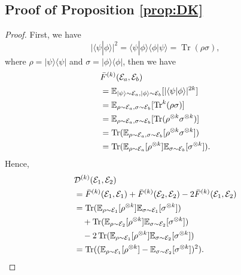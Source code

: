 \documentclass[aps,prx,reprint,superscriptaddress,amsmath,amssymb,longbibliography,floatfix]{revtex4-2}
\newcommand{\abs}[1]{\lvert #1\rvert}
\providecommand{\ket}[1]{|#1 \rangle}
\providecommand{\braket}[2]{\langle #1|#2 \rangle}
\providecommand{\ketbra}[2]{|#1\rangle \langle #2|}
\newcommand{\dsE}{\mathbb{E}}
\newcommand{\scD}{\mathcal{D}}
\newcommand{\scE}{\mathcal{E}}
\newcommand{\Tr}{\operatorname{Tr}}
\theoremstyle{plain}
\theoremstyle{definition}
\theoremstyle{remark}
\begin{document}
\label{appsub: proofs of MMD-k's properties}
\subsection{Proof of Proposition \ref{prop:DK}}
\begin{proof}
First, we have
\begin{equation*}
    \abs{\braket{\psi}{\phi}}^2=\braket{\psi}{\phi}\braket{\phi}{\psi}=\Tr(\rho\sigma),
\end{equation*}
where $\rho=\ketbra{\psi}{\psi}$ and $\sigma=\ketbra{\phi}{\phi}$, then we have
\begin{align}
&\bar{F}^{(k)}(\scE_a, \scE_b) 
    \notag\\
    &= \dsE_{\ket{\psi}\sim\scE_a, \ket{\phi}\sim\scE_b} [\abs{\braket{\psi}{\phi}}^{2k}]\notag\\
    &= \dsE_{\rho\sim\scE_a, \sigma\sim\scE_b}[\Tr^k(\rho\sigma)]\notag\\
    &= \dsE_{\rho\sim\scE_a, \sigma\sim\scE_b}[\Tr(\rho^{\otimes k}\sigma^{\otimes k})]\notag\\
    &= \Tr(\dsE_{\rho\sim\scE_a, \sigma\sim\scE_b}[\rho^{\otimes k}\sigma^{\otimes k}]) \notag\\
    &= \Tr(\dsE_{\rho\sim\scE_a}[\rho^{\otimes k}] \dsE_{\sigma\sim\scE_b}[\sigma^{\otimes k}]).
\label{eq:app-frame-potential-moments}
\end{align}
Hence,
\begin{align}
&
    \scD^{(k)}(\scE_1,\scE_2) 
    \notag\\
    &= \bar{F}^{(k)}(\scE_1, \scE_1)+\bar{F}^{(k)}(\scE_2, \scE_2) - 2\bar{F}^{(k)}(\scE_1, \scE_2)\notag\\
    &=\Tr(\dsE_{\rho\sim\scE_1}[\rho^{\otimes k}] \dsE_{\sigma\sim\scE_1}[\sigma^{\otimes k}])\notag\\
    &\quad+ \Tr(\dsE_{\rho\sim\scE_2}[\rho^{\otimes k}] \dsE_{\sigma\sim\scE_2}[\sigma^{\otimes k}])\notag\\
    &\quad-2 \Tr(\dsE_{\rho\sim\scE_1}[\rho^{\otimes k}] \dsE_{\sigma\sim\scE_2}[\sigma^{\otimes k}])\notag\\
    &= \Tr((\dsE_{\rho\sim\scE_1}[\rho^{\otimes k}]- \dsE_{\sigma\sim\scE_2}[\sigma^{\otimes k}])^2).
\label{eq:app-mmd-hilbert-schmidt}
\end{align}
\end{proof}
\end{document}
